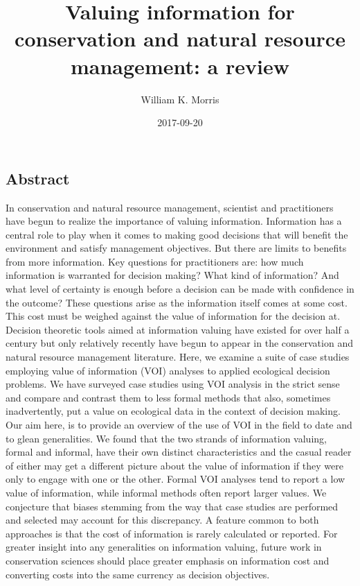 \documentclass[]{article}
\title{Valuing information for conservation and natural resource management: a
review}
\author{William K. Morris}
\date{2017-09-20}
\theoremstyle{definition}
\theoremstyle{definition}
\theoremstyle{definition}
\theoremstyle{remark}
\begin{document}
\maketitle


\subsection*{Abstract}\label{abstract}

In conservation and natural resource management, scientist and practitioners have begun to realize the importance of valuing information. Information has a central role to play when it comes to making good decisions that will benefit the environment and satisfy management objectives. But there are limits to benefits from more information. Key questions for practitioners are: how much information is warranted for decision making? What kind of information? And what level of certainty is enough before a decision can be made with confidence in the outcome? These questions arise as the information itself comes at some cost. This cost must be weighed against the value of information for the decision at. Decision theoretic tools aimed at information valuing have existed for over half a century but only relatively recently have begun to appear in the conservation and natural resource management literature. Here, we examine a suite of case studies employing value of information (VOI) analyses to applied ecological decision problems. We have surveyed case studies using VOI analysis in the strict sense and compare and contrast them to less formal methods that also, sometimes inadvertently, put a value on ecological data in the context of decision making. Our aim here, is to provide an overview of the use of VOI in the field to date and to glean generalities. We found that the two strands of information valuing, formal and informal, have their own distinct characteristics and the casual reader of either may get a different picture about the value of information if they were only to engage with one or the other. Formal VOI analyses tend to report a low value of information, while informal methods often report larger values. We conjecture that biases stemming from the way that case studies are performed and selected may account for this discrepancy. A feature common to both approaches is that the cost of information is rarely calculated or reported. For greater insight into any generalities on information valuing, future work in conservation sciences should place greater emphasis on information cost and converting costs into the same currency as decision objectives.
\end{document}
